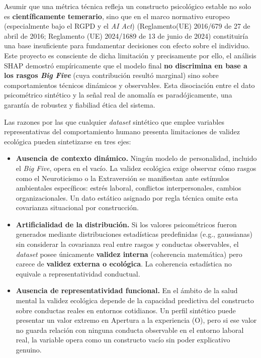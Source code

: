 \documentclass[IB]{TFUOC}%
\begin{document}
\medskip
\noindent Asumir que una métrica técnica refleja un constructo psicológico 
estable no solo es \textbf{científicamente temerario}, sino que en el marco 
normativo europeo (especialmente bajo el RGPD y el \textit{AI Act}) (Reglamento(UE) 2016/679 de 27 de abril de 2016; Reglamento (UE) 2024/1689 de 13 de junio de 2024) constituiría una base insuficiente para fundamentar decisiones con efecto sobre el individuo. Este proyecto es consciente de dicha limitación y precisamente por ello, el análisis SHAP demostró empíricamente que el modelo final \textbf{no discrimina en base a los rasgos \textit{Big Five}} (cuya 
contribución resultó marginal) sino sobre comportamientos técnicos dinámicos 
y observables. Esta disociación entre el dato psicométrico sintético y la 
señal real de anomalía es paradójicamente, una garantía de robustez y fiabiliad ética 
del sistema.

\medskip
\noindent Las razones por las que cualquier \textit{dataset} sintético que 
emplee variables representativas del comportamiento humano presenta 
limitaciones de validez ecológica pueden sintetizarse en tres ejes:

\begin{itemize}

    \item \textbf{Ausencia de contexto dinámico.} 
    Ningún modelo de personalidad, incluido el \textit{Big Five}, opera en 
    el vacío. La validez ecológica exige observar cómo rasgos como el 
    Neuroticismo o la Extraversión se manifiestan ante estímulos ambientales 
    específicos: estrés laboral, conflictos interpersonales, cambios 
    organizacionales. Un dato estático asignado por regla técnica omite 
    esta covarianza situacional por construcción.

    \item \textbf{Artificialidad de la distribución.} 
    Si los valores psicométricos fueron generados mediante distribuciones 
    estadísticas predefinidas (e.g., gaussianas) sin considerar la 
    covarianza real entre rasgos y conductas observables, el \textit{dataset} 
    posee únicamente \textbf{validez interna} (coherencia matemática) 
    pero carece de \textbf{validez externa o ecológica}. La coherencia 
    estadística no equivale a representatividad conductual.

    \item \textbf{Ausencia de representatividad funcional.} 
    En el ámbito de la salud mental la validez ecológica depende de la 
    capacidad predictiva del constructo sobre conductas reales en entornos 
    cotidianos. Un perfil sintético puede presentar un valor extremo en 
    Apertura a la experiencia (O), pero si ese valor no guarda relación 
    con ninguna conducta observable en el entorno laboral real, la variable 
    opera como un constructo vacío sin poder explicativo genuino.

\end{itemize}
\end{document}
